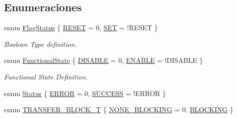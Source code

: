\subsection*{Enumeraciones}
\begin{DoxyCompactItemize}
\item 
enum \hyperlink{group___l_p_c___types___public___types_ga89136caac2e14c55151f527ac02daaff}{Flag\+Status} \{ \hyperlink{group___l_p_c___types___public___types_gga89136caac2e14c55151f527ac02daaffa589b7d94a3d91d145720e2fed0eb3a05}{R\+E\+S\+ET} = 0, 
\hyperlink{group___l_p_c___types___public___types_gga89136caac2e14c55151f527ac02daaffab44c8101cc294c074709ec1b14211792}{S\+ET} = !\+R\+E\+S\+ET
 \}\begin{DoxyCompactList}\small\item\em Boolean Type definition. \end{DoxyCompactList}
\item 
enum \hyperlink{group___l_p_c___types___public___types_gac9a7e9a35d2513ec15c3b537aaa4fba1}{Functional\+State} \{ \hyperlink{group___l_p_c___types___public___types_ggac9a7e9a35d2513ec15c3b537aaa4fba1ad3a9df141be0ccf10389b640f492b26d}{D\+I\+S\+A\+B\+LE} = 0, 
\hyperlink{group___l_p_c___types___public___types_ggac9a7e9a35d2513ec15c3b537aaa4fba1a7d46875fa3ebd2c34d2756950eda83bf}{E\+N\+A\+B\+LE} = !\+D\+I\+S\+A\+B\+LE
 \}\begin{DoxyCompactList}\small\item\em Functional State Definition. \end{DoxyCompactList}
\item 
enum \hyperlink{group___l_p_c___types___public___types_ga67a0db04d321a74b7e7fcfd3f1a3f70b}{Status} \{ \hyperlink{group___l_p_c___types___public___types_gga67a0db04d321a74b7e7fcfd3f1a3f70ba2fd6f336d08340583bd620a7f5694c90}{E\+R\+R\+OR} = 0, 
\hyperlink{group___l_p_c___types___public___types_gga67a0db04d321a74b7e7fcfd3f1a3f70bac7f69f7c9e5aea9b8f54cf02870e2bf8}{S\+U\+C\+C\+E\+SS} = !\+E\+R\+R\+OR
 \}
\item 
enum \hyperlink{group___l_p_c___types___public___types_gaf5297347bed33665c55dd0e9c7840403}{T\+R\+A\+N\+S\+F\+E\+R\+\_\+\+B\+L\+O\+C\+K\+\_\+T} \{ \hyperlink{group___l_p_c___types___public___types_ggaf5297347bed33665c55dd0e9c7840403ae00130e64382c35d172d226b79aa9acb}{N\+O\+N\+E\+\_\+\+B\+L\+O\+C\+K\+I\+NG} = 0, 
\hyperlink{group___l_p_c___types___public___types_ggaf5297347bed33665c55dd0e9c7840403a854a1cd6e3a98db9e290dddea29725e7}{B\+L\+O\+C\+K\+I\+NG}
 \}
\end{DoxyCompactItemize}


